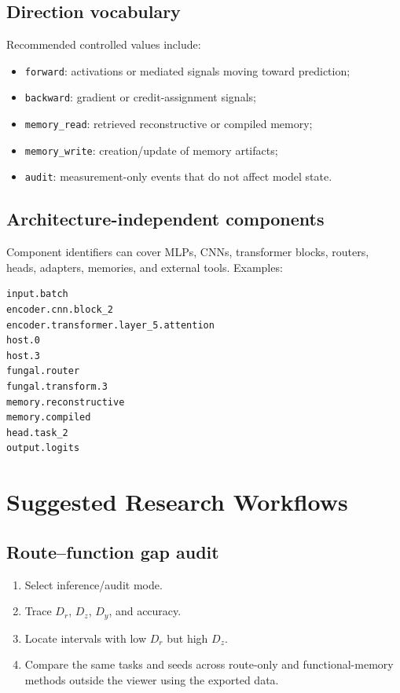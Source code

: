 \documentclass[11pt,a4paper]{article}
\newcommand{\code}[1]{\texttt{#1}}
\begin{document}
\subsection{Direction vocabulary}

Recommended controlled values include:

\begin{itemize}
  \item \code{forward}: activations or mediated signals moving toward prediction;
  \item \code{backward}: gradient or credit-assignment signals;
  \item \code{memory\_read}: retrieved reconstructive or compiled memory;
  \item \code{memory\_write}: creation/update of memory artifacts;
  \item \code{audit}: measurement-only events that do not affect model state.
\end{itemize}

\subsection{Architecture-independent components}

Component identifiers can cover MLPs, CNNs, transformer blocks, routers, heads, adapters, memories, and external tools. Examples:

\begin{lstlisting}[language={},caption={Example component identifiers}]
input.batch
encoder.cnn.block_2
encoder.transformer.layer_5.attention
host.0
host.3
fungal.router
fungal.transform.3
memory.reconstructive
memory.compiled
head.task_2
output.logits
\end{lstlisting}

\section{Suggested Research Workflows}

\subsection{Route--function gap audit}

\begin{enumerate}
  \item Select inference/audit mode.
  \item Trace $D_r$, $D_z$, $D_y$, and accuracy.
  \item Locate intervals with low $D_r$ but high $D_z$.
  \item Compare the same tasks and seeds across route-only and functional-memory methods outside the viewer using the exported data.
\end{enumerate}
\end{document}
